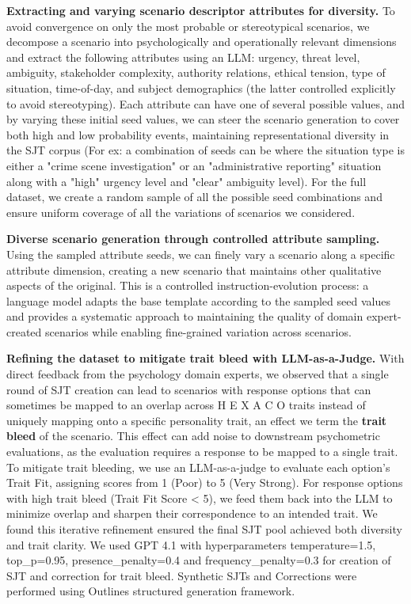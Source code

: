\documentclass[11pt]{article}
\newcommand{\hexaco}{%
  {\textcolor{hexH}{H}}%
  {\textcolor{hexE}{E}}%
  {\textcolor{hexX}{X}}%
  {\textcolor{hexA}{A}}%
  {\textcolor{hexC}{C}}%
  {\textcolor{hexO}{O}}%
}
\begin{document}
\noindent\textbf{Extracting and varying scenario descriptor attributes for diversity.} To avoid convergence on only the most probable or stereotypical scenarios, we decompose a scenario into psychologically and operationally relevant dimensions and extract the following attributes using an LLM: urgency, threat level, ambiguity, stakeholder complexity, authority relations, ethical tension, type of situation, time-of-day, and subject demographics (the latter controlled explicitly to avoid stereotyping). Each attribute can have one of several possible values, and by varying these initial seed values, we can steer the scenario generation to cover both high and low probability events, maintaining representational diversity in the SJT corpus (For ex:  a combination of seeds can be where the situation type is either a "crime scene investigation" or an "administrative reporting" situation along with a "high" urgency level and "clear" ambiguity level). For the full dataset, we create a random sample of all the possible seed combinations and ensure uniform coverage of all the variations of scenarios we considered.

\vspace{0.3cm}

\noindent \textbf{Diverse scenario generation through controlled attribute sampling.} Using the sampled attribute seeds, we can finely vary a scenario along a specific attribute dimension, creating a new scenario that maintains other qualitative aspects of the original. This is a controlled instruction-evolution process: a language model adapts the base template according to the sampled seed values and provides a systematic approach to maintaining the quality of domain expert-created scenarios while enabling fine-grained variation across scenarios. 

\vspace{0.3cm}

\noindent \textbf{Refining the dataset to mitigate trait bleed with LLM-as-a-Judge.} With direct feedback from the psychology domain experts, we observed that a single round of SJT creation can lead to scenarios with response options that can sometimes be mapped to an overlap across \hexaco\;  traits instead of uniquely mapping onto a specific personality trait, an effect we term the \textbf{trait bleed} of the scenario. This effect can add noise to downstream psychometric evaluations, as the evaluation requires a response to be mapped to a single trait. To mitigate trait bleeding, we use an LLM-as-a-judge to evaluate each option’s Trait Fit, assigning scores from 1 (Poor) to 5 (Very Strong). For response options with high trait bleed (Trait Fit Score < 5), we feed them back into the LLM to minimize overlap and sharpen their correspondence to an intended trait. We found this iterative refinement ensured the final SJT pool achieved both diversity and trait clarity.  We used GPT 4.1 with hyperparameters temperature=1.5, top\_p=0.95, presence\_penalty=0.4 and frequency\_penalty=0.3 for creation of SJT and correction for trait bleed. Synthetic SJTs and Corrections were performed using Outlines \citep{willard2023efficient} structured generation framework.
\end{document}

